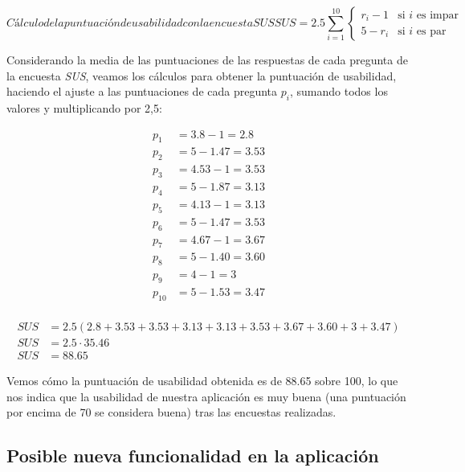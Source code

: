 \begin{equation}[EQ:SUS]{Cálculo de la puntuación de usabilidad con la encuesta \textit{SUS}}
	\boxed{SUS = 2.5 \sum_{i=1}^{10}  \begin{cases}
        r_i - 1 & \text{si } i \text{ es impar} \\
        5 - r_i & \text{si } i \text{ es par}
        \end{cases}
        }
\end{equation}

Considerando la media de las puntuaciones de las respuestas de cada pregunta de la encuesta \textit{SUS}, veamos los cálculos
para obtener la puntuación de usabilidad, haciendo el ajuste a las puntuaciones de cada pregunta $p_i$, sumando todos los valores
y multiplicando por 2,5:

    \begin{align*}
        p_1 &= 3.8 - 1 = 2.8 \\
        p_2 &= 5 - 1.47 = 3.53 \\
        p_3 &= 4.53 - 1 = 3.53 \\
        p_4 &= 5 - 1.87 = 3.13 \\
        p_5 &= 4.13 - 1 = 3.13 \\
        p_6 &= 5 - 1.47 = 3.53 \\
        p_7 &= 4.67 - 1 = 3.67 \\
        p_8 &= 5 - 1.40 = 3.60 \\
        p_9 &= 4 - 1 = 3 \\
        p_{10} &= 5 - 1.53 = 3.47 \\
    \end{align*}

    \begin{align*}
        SUS &= 2.5 (2.8 + 3.53 + 3.53 + 3.13 + 3.13 + 3.53 + 3.67 + 3.60 + 3 + 3.47) \\
        SUS &= 2.5 \cdot 35.46 \\
        SUS &= 88.65
    \end{align*}

Vemos cómo la puntuación de usabilidad obtenida es de 88.65 sobre 100, lo que nos indica que la usabilidad de nuestra aplicación
es muy buena (una puntuación por encima de 70 se considera buena) tras las encuestas realizadas.

\subsection{Posible nueva funcionalidad en la aplicación\label{SEC:GESTION_USUARIOS}}

